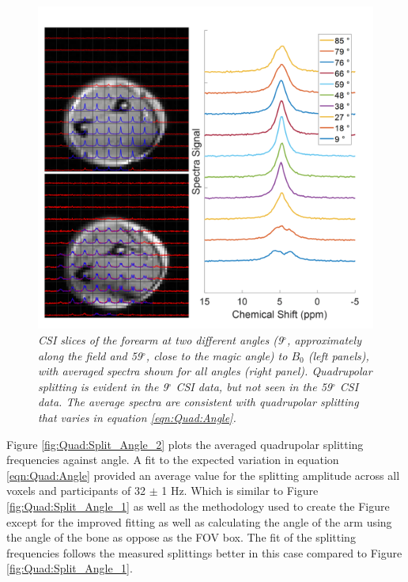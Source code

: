\begin{figure}
    \centering
    \includegraphics[width=1\textwidth]{Figures/Quad/Arm_CSI_Angle.png}
    \caption{\textit{\ac{CSI} slices of the forearm at two different angles (9$^\circ$, approximately along the field and 59$^\circ$, close to the magic angle) to $B_0$ (left panels), with averaged spectra shown for all angles (right panel). Quadrupolar splitting is evident in the 9$^\circ$ \ac{CSI} data, but not seen in the 59$^\circ$ \ac{CSI} data. The average spectra are consistent with quadrupolar splitting that varies in equation \ref{eqn:Quad:Angle}.}}
    \label{fig:Quad:Arm_CSI}
\end{figure}

 Figure \ref{fig:Quad:Split_Angle_2} plots the averaged quadrupolar splitting frequencies against angle. A fit to the expected variation in equation \ref{eqn:Quad:Angle} provided an average value for the splitting amplitude across all voxels and participants of 32 $\pm$ 1 Hz. Which is similar to Figure \ref{fig:Quad:Split_Angle_1} as well as the methodology used to create the Figure except for the improved fitting as well as calculating the angle of the arm using the angle of the bone as oppose as the FOV box. The fit of the splitting frequencies follows the measured splittings better in this case compared to Figure \ref{fig:Quad:Split_Angle_1}.

